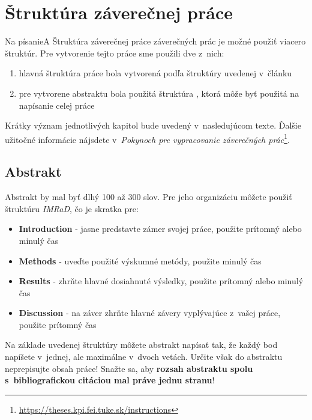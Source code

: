 
\chapter{Štruktúra záverečnej práce}\label{app:structure}

Na písanieA Štruktúra záverečnej práce záverečných prác je možné použiť viacero štruktúr. Pre vytvorenie tejto práce sme použili dve z~nich:

\begin{enumerate}
    \item hlavná štruktúra práce bola vytvorená podľa štruktúry uvedenej v~článku \cite{Beel2010}
    \item pre vytvorene abstraktu bola použitá štruktúra \cite{WikipediaImrad}, ktorá môže byť použitá na napísanie celej práce
\end{enumerate}

Krátky význam jednotlivých kapitol bude uvedený v~nasledujúcom texte. Ďalšie užitočné informácie nájsdete v~\emph{Pokynoch pre vypracovanie záverečných prác}\footnote{\url{https://theses.kpi.fei.tuke.sk/instructions}}.


\section*{Abstrakt}


Abstrakt by mal byť dlhý 100 až 300 slov. Pre jeho organizáciu môžete použiť štruktúru \emph{IMRaD}, čo je skratka pre:

\begin{itemize}
    \item \textbf{Introduction} - jasne predstavte zámer svojej práce, použite prítomný alebo minulý čas
    \item \textbf{Methods} - uveďte použité výskumné metódy, použite minulý čas
    \item \textbf{Results} - zhrňte hlavné dosiahnuté výsledky, použite prítomný alebo minulý čas
    \item \textbf{Discussion} - na záver zhrňte hlavné závery vyplývajúce z~vašej práce, použite prítomný čas
\end{itemize}

Na základe uvedenej štruktúry môžete abstrakt napísať tak, že každý bod napíšete v~jednej, ale maximálne v~dvoch vetách. Určite však do abstraktu neprepisujte obsah práce! Snažte sa, aby {\bf rozsah abstraktu spolu s~bibliografickou citáciou mal práve jednu stranu}!


